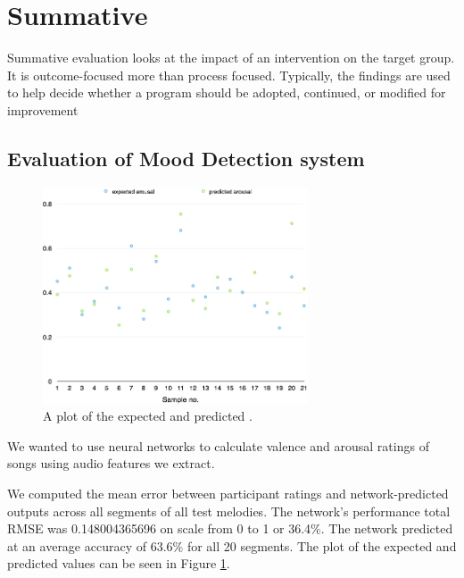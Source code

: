 \section{Summative}
Summative evaluation looks at the impact of an intervention on the target group. It is outcome-focused more than process focused. Typically, the findings are used to help decide whether a program should be adopted, continued, or modified for improvement

\vspace{10pt}

\subsection{Evaluation of Mood Detection system}

\begin{figure}[t]
    \includegraphics[width=0.7\textwidth]{Figures/finalarousal}
    \centering

  \caption{A plot of the expected and predicted .}
  \label{fig:anneval}
\end{figure}


We wanted to use neural networks to calculate valence and arousal ratings of songs using audio features we extract. 

We computed the mean error between participant ratings and network-predicted outputs across all segments of all test melodies. The network's performance total RMSE was 0.148004365696 on scale from 0 to 1 or 36.4\%.
The network predicted at an average accuracy of 63.6\% for all 20 segments. The plot of the expected and predicted values can be seen in Figure \ref{fig:anneval}.


